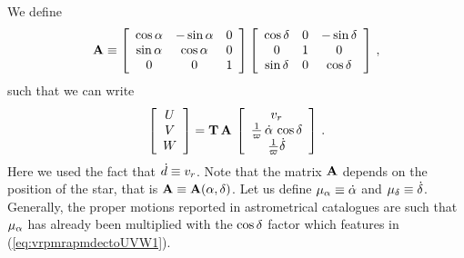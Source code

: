 We define
\begin{equation}
\mathbf{A} \equiv \left[ \begin{array}{ccc} \cos \alpha & -\sin \alpha & 0 \\ \sin \alpha & \cos \alpha & 0 \\ 0 & 0& 1 \end{array} \right]
\left[ \begin{array}{ccc} \cos \delta & 0 & -\sin \delta\\ 0 & 1 & 0 \\ \sin \delta  & 0 & \cos\delta\end{array} \right]\, ,
\end{equation}
such that we can write
\begin{equation}\label{eq:vrpmrapmdectoUVW1}
\left[ \begin{array}{c} U \\ V \\ W \end{array} \right] =
\mathbf{T} \, \mathbf{A} \, \left[ \begin{array}{c} v_r  \\ \frac{1}{\varpi}\,\dot{\alpha}\,\cos\delta\\\frac{1}{\varpi}\dot{\delta}\end{array} \right]\, .
\end{equation}
Here we used the fact that $\dot{d} \equiv v_r$. Note that
the matrix $\mathbf{A}$ depends on the position of the star, that is $\mathbf{A}
\equiv \mathbf{A}(\alpha,\delta)$. Let us define $\mu_{\alpha} \equiv \dot{\alpha}$ and
$\mu_{\delta} \equiv \dot{\delta}$. Generally, the proper motions reported in
astrometrical catalogues are such that $\mu_{\alpha}$ has already been
multiplied with the $\cos \delta$ factor which features in
(\ref{eq:vrpmrapmdectoUVW1}).

